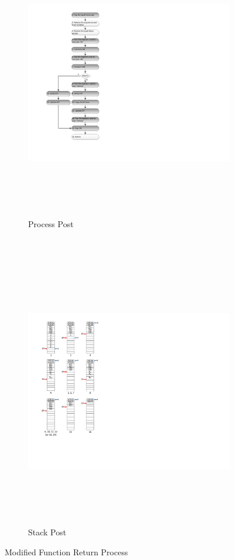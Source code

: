 \begin{figure}
        \centering
        \begin{subfigure}[b]{0.5\columnwidth}
                \includegraphics[width=\textwidth, height=12cm]{figures/modified_function_operations_process_post_execution_v1}
                \caption{Process Post}
                \label{fig:modified_function_operation_process_post_execution}
        \end{subfigure}~
        \begin{subfigure}[b]{0.5\columnwidth}
                \includegraphics[width=\textwidth, height=12cm]{figures/modified_function_operations_stack_post_execution_v1}
                \caption{Stack Post}
                \label{fig:modified_function_operation_stack_post_execution}
        \end{subfigure}
        \caption{Modified Function Return Process}\label{fig:modified_function_operation_post_execution}
\end{figure}

